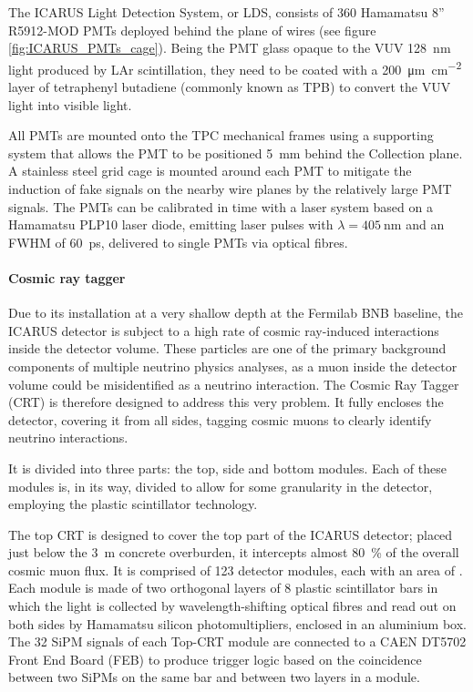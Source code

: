 The ICARUS Light Detection System, or LDS, consists of \num{360} Hamamatsu 8'' R5912-MOD PMTs deployed behind the plane of wires (see figure \ref{fig:ICARUS_PMTs_cage}). Being the PMT glass opaque to the VUV \SI{128}{\nm} light produced by LAr scintillation, they need to be coated with a \SI{200}{\um\per\cm\squared} layer of tetraphenyl butadiene (commonly known as TPB) to convert the VUV light into visible light. 

All PMTs are mounted onto the TPC mechanical frames using a supporting system that allows the PMT to be positioned \SI{5}{\mm} behind the Collection plane. A stainless steel grid cage is mounted around each PMT to mitigate the induction of fake signals on the nearby wire planes by the relatively large PMT signals. The PMTs can be calibrated in time with a laser system based on a Hamamatsu PLP10 laser  diode, emitting laser pulses with $\lambda = \SI{405}{\nm}$ and an FWHM of \SI{60}{ps}, delivered to single PMTs via optical fibres. 

\paragraph{Cosmic ray tagger} Due to its installation at a very shallow depth at the Fermilab BNB baseline, the ICARUS detector is subject to a high rate of cosmic ray-induced interactions inside the detector volume. These particles are one of the primary background components of multiple neutrino physics analyses, as a muon inside the detector volume could be misidentified as a neutrino interaction. The Cosmic Ray Tagger (CRT) is therefore designed to address this very problem. It fully encloses the detector, covering it from all sides, tagging cosmic muons to clearly identify neutrino interactions. 

It is divided into three parts: the top, side and bottom modules. Each of these modules is, in its way, divided to allow for some granularity in the detector, employing the plastic scintillator technology. 

The top CRT is designed to cover the top part of the ICARUS detector; placed just below the \SI{3}{\m} concrete overburden, it intercepts almost \SI{80}{\percent} of the overall cosmic muon flux. It is comprised of 123 detector modules, each with an area of . Each module is made of two orthogonal layers of 8 plastic scintillator bars in which the light is collected by wavelength-shifting optical fibres and read out on both sides by Hamamatsu silicon photomultipliers, enclosed in an aluminium box. The 32 SiPM signals of each Top-CRT module are connected to a CAEN DT5702 Front End  Board (FEB) to produce trigger logic based on  the coincidence between two SiPMs on the same bar and between two layers in a module. 


